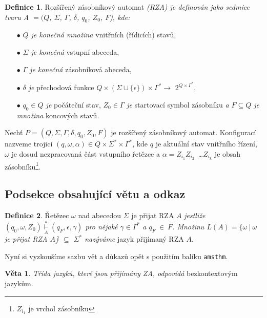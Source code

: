 \documentclass[a4paper, 11pt, twocolumn]{article}
\theoremstyle{definition}
\newtheorem{definition}{Definice}
\newtheorem{veta}{Věta}
\begin{document}
\begin{definition}
    \label{Definice} Rozšířený zásobníkový automat \emph{(RZA) je de\-finován jako sedmice tvaru A $= (Q$, $\Sigma$, $\Gamma$, $\delta$, $ q_0$, $Z_0$, $F$),
    kde: }
    \begin{itemize}
        \item[$\bullet$] \emph{$Q$ je konečná množina} vnitřních (řídicích) stavů,
        \item[$\bullet$] \emph{$\Sigma$ je konečná} vstupní abeceda,
        \item[$\bullet$] \emph{$\Gamma$ je konečná} zásobníková abeceda,
        \item[$\bullet$] \emph{$\delta$ je} přechodová funkce $Q \times (\Sigma \cup \{\epsilon\}) \times
        \Gamma^*\rightarrow$ $ 2^{Q \times \Gamma^*}$,
        \item[$\bullet$] \emph{$q_0 \in Q$ je} počáteční stav, $Z_0 \in \Gamma$ \emph{je} startovací symbol zásobníku \emph{a $F \subseteq Q$ je množina} koncových stavů.
        
    \end{itemize}
    
    Nechť $P = (Q,\Sigma,\Gamma,\delta,q_0,Z_0,F)$ je rozšířený zásob\-níkový automat. Konfigurací nazveme trojici $(q, \omega, \alpha) \in Q \times \Sigma^* \times \Gamma^*$, kde $q$ je aktuální stav vnitřního řízení, $\omega$ je dosud nezpracovaná část vstupního řetězce a $\alpha = Z_{i_1} Z_{i_2}$~\dots $Z_{i_k}$ je obsah zásobníku\footnote{$Z_{i_1}$ je vrchol zásobníku}.
    
\end{definition}
\subsection{Podsekce obsahující větu a odkaz}

\begin{definition}\label{Definice2}
Řetězec $\omega$ nad abecedou $\Sigma$ je přijat RZA $A$ \emph{jestliže $(q_0, \omega, Z_0) \overset{*}{\underset{A}{\vdash}} (q_F,\epsilon,\gamma)$ pro nějaké $\gamma \in \Gamma^*$ a $q_F~\in~F$. Množinu $L(A)  = \{ \omega~|~\omega$ je přijat RZA $A$\} $\subseteq$ $\Sigma^*$ nazýváme} jazyk přijímaný RZA $A$.

\end{definition}
Nyní si vyzkoušíme sazbu vět a důkazů opět s použitím balíku \verb|amsthm|. 
\begin{veta}
\emph{Třída jazyků, které jsou přijímány ZA, odpovídá} bezkontextovým jazykům.
\end{veta}
\end{document}
